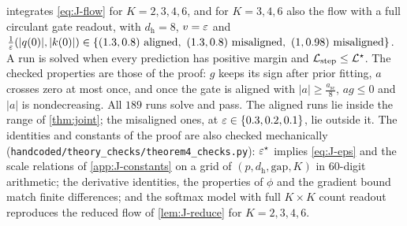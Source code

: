 \label{app:J-generalK}

 integrates \cref{eq:J-flow} for $K=2,3,4,6$, and for $K=3,4,6$ also the flow with a full circulant gate readout, with
$d_{\mathrm h}=8$, $v=\varepsilon$ and $\frac{1}{\varepsilon}(|q(0)|,|k(0)|)\in\{(1.3,0.8)\text{ aligned},\ (1.3,0.8)\text{ misaligned},\ (1,0.98)\text{ misaligned}\}$. A run is solved when every
prediction has positive margin and $\mathcal L_{\mathrm{step}}\le \mathcal L^\star$. The checked properties are those of the proof: $g$ keeps its sign after prior
fitting, $a$ crosses zero at most once, and once the gate is aligned with $|a|\ge\frac{a_{\mathrm{sc}}}{8}$, $ag\le0$ and $|a|$ is nondecreasing. All $189$ runs
solve and pass. The aligned runs lie inside the range of \cref{thm:joint}; the misaligned ones, at $\varepsilon\in\{0.3,0.2,0.1\}$, lie outside it.
The identities and constants of the proof are also checked mechanically (\texttt{handcoded/theory\_checks/theorem4\_checks.py}): $\varepsilon^\star$
implies \cref{eq:J-eps} and the scale relations of \cref{app:J-constants} on a grid of $(p,d_{\mathrm h},\mathrm{gap},K)$ in $60$-digit arithmetic; the
derivative identities, the properties of $\phi$ and the gradient bound match finite differences; and the softmax model with full
$K\times K$ count readout reproduces the reduced flow of \cref{lem:J-reduce} for $K=2,3,4,6$.

